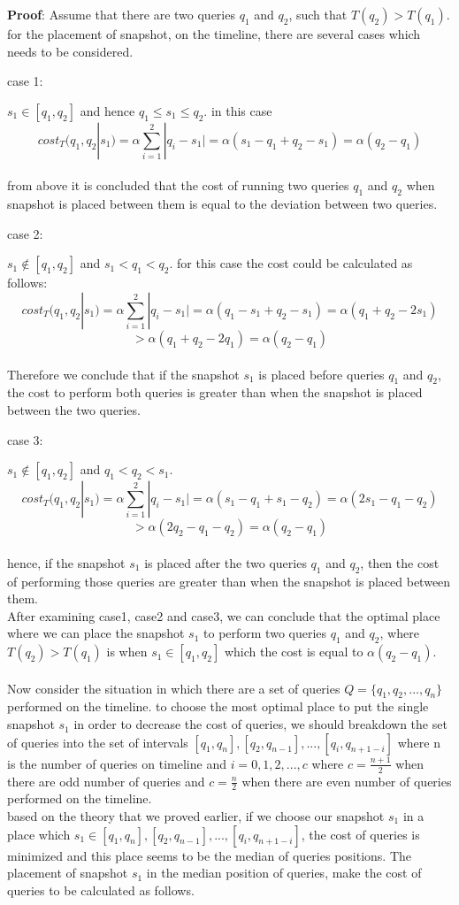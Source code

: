 \textbf{Proof}:
Assume that there are two queries $q_1$ and $q_2$, such that $T(q_2)>T(q_1)$. for the placement of snapshot, on the timeline, there are several cases which needs to be considered.\\
\begin{large}
	case 1:
\end{large}
$s_1 \in [q_1,q_2]$ and hence $q_1\leq s_1\leq q_2$.
in this case\\
$$cost_T(q_1,q_2|s_1)=\alpha\sum_{i=1}^2|q_i-s_1| = \alpha(s_1-q_1+q_2-s_1)=\alpha(q_2-q_1)$$\\
from above it is concluded that the cost of running two queries $q_1$ and $q_2$ when snapshot is placed between them is equal to the deviation between two queries.\\
\begin{large}
	case 2:
\end{large}
$s_1 \notin [q_1,q_2]$ and $s_1 < q_1 < q_2$. for this case the cost could be calculated as follows:
$$cost_T(q_1,q_2|s_1)=\alpha\sum_{i=1}^2|q_i-s_1| = \alpha(q_1-s_1+q_2-s_1)=\alpha(q_1+q_2-2s_1) $$$$>\alpha(q_1+q_2-2q_1)=\alpha(q_2-q_1)$$\\
Therefore we conclude that if the snapshot $s_1$ is placed before queries $q_1$ and $q_2$, the cost to perform both queries is greater than when the snapshot is placed between the two queries.\\
\begin{large}
	case 3:
\end{large}
$s_1 \notin [q_1,q_2]$ and $q_1 < q_2 < s_1$.
$$cost_T(q_1,q_2|s_1)=\alpha\sum_{i=1}^2|q_i-s_1| = \alpha(s_1-q_1+s_1-q_2)=\alpha(2s_1-q_1-q_2) $$$$>\alpha(2q_2-q_1-q_2)=\alpha(q_2-q_1)$$\\
hence, if the snapshot $s_1$ is placed after the two queries $q_1$ and $q_2$, then the cost of performing those queries are greater than when the snapshot is placed between them.\\
After examining case1, case2 and case3, we can conclude that the optimal place where we can place the snapshot $s_1$ to perform two queries $q_1$ and $q_2$, where $T(q_2)>T(q_1)$ is when $s_1 \in [q_1,q_2]$ which the cost is equal to $\alpha(q_2-q_1)$.\\
\\
Now consider the situation in which there are a set of queries $Q=\{q_1,q_2,...,q_n\}$ performed on the timeline. to choose the most optimal place to put the single snapshot $s_1$ in order to decrease the cost of queries, we should breakdown the set of queries into the set of intervals $[q_1,q_n],[q_2,q_{n-1}],...,[q_i,q_{n+1-i}]$ where n is the number of queries on timeline and $i=0,1,2,...,c$ where $c=\frac{n+1}{2}$ when there are odd number of queries and $c=\frac{n}{2}$ when there are even number of queries performed on the timeline.\\ based on the theory that we proved earlier, if we choose our snapshot $s_1$ in a place which $s_1\in[q_1,q_n],[q_2,q_{n-1}],...,[q_i,q_{n+1-i}]$, the cost of queries is minimized and this place seems to be the median of queries positions. The placement of snapshot $s_1$ in the median position of queries, make the cost of queries to be calculated as follows.
